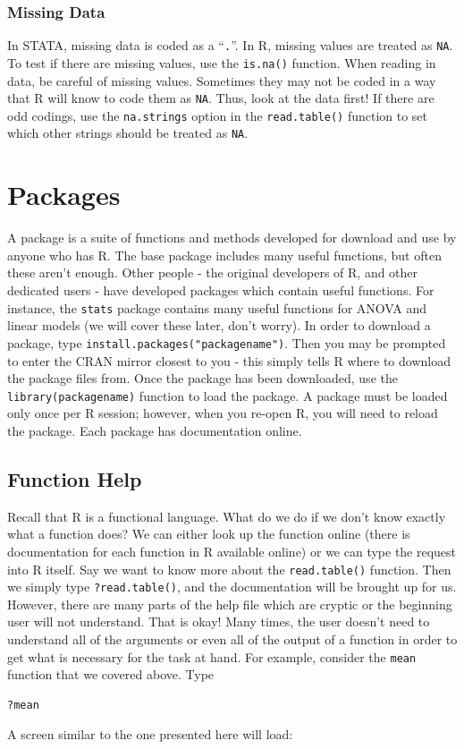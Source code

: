 \documentclass[11pt,letterpaper,fleqn]{report}
\begin{document}
\subsection{Missing Data}
In STATA, missing data is coded as a ``\texttt{.}''. In R, missing values are treated as \texttt{NA}. To test if there are missing values, use the \texttt{is.na()} function. When reading in data, be careful of missing values. Sometimes they may not be coded in a way that R will know to code them as \texttt{NA}. Thus, look at the data first! If there are odd codings, use the \texttt{na.strings} option in the \texttt{read.table()} function to set which other strings should be treated as \texttt{NA}.
\chapter{Packages}
A package is a suite of functions and methods developed for download and use by anyone who has R. The base package includes many useful functions, but often these aren't enough. Other people - the original developers of R, and other dedicated users - have developed packages which contain useful functions. For instance, the \texttt{stats} package contains many useful functions for ANOVA and linear models (we will cover these later, don't worry). In order to download a package, type \texttt{install.packages("packagename")}. Then you may be prompted to enter the CRAN mirror closest to you - this simply tells R where to download the package files from. Once the package has been downloaded, use the \texttt{library(packagename)} function to load the package. A package must be loaded only once per R session; however, when you re-open R, you will need to reload the package. Each package has documentation online.
\section{Function Help}
Recall that R is a functional language. What do we do if we don't know exactly what a function does? We can either look up the function online (there is documentation for each function in R available online) or we can type the request into R itself. Say we want to know more about the \texttt{read.table()} function. Then we simply type \texttt{?read.table()}, and the documentation will be brought up for us.\\

However, there are many parts of the help file which are cryptic or the beginning user will not understand. That is okay! Many times, the user doesn't need to understand all of the arguments or even all of the output of a function in order to get what is necessary for the task at hand. For example, consider the \texttt{mean} function that we covered above. Type 
\begin{verbatim}
?mean
\end{verbatim}
A screen similar to the one presented here will load:
\end{document}

